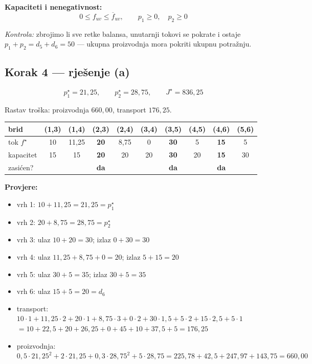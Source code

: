 \begin{zadatak}
\textbf{Kapaciteti i nenegativnost:}
\[
0 \le f_{uv} \le \overline{f}_{uv}, \qquad p_1 \ge 0, \quad p_2 \ge 0
\]

\emph{Kontrola:} zbrojimo li sve retke balansa, unutarnji tokovi se pokrate i
ostaje $p_1 + p_2 = d_5 + d_6 = 50$ --- ukupna proizvodnja mora pokriti ukupnu
potražnju. \checkmark

\subsection*{Korak 4 --- rješenje (a)}

\[
\boxed{\; p_1^\star = 21{,}25, \qquad p_2^\star = 28{,}75, \qquad
J^\star = 836{,}25 \;}
\]

Rastav troška: proizvodnja $660{,}00$, transport $176{,}25$.

\begin{center}
\begin{tabular}{lccccccccc}
\toprule
\textbf{brid} & (1,3) & (1,4) & (2,3) & (2,4) & (3,4) & (3,5) & (4,5) & (4,6) & (5,6) \\
\midrule
tok $f^\star$ & 10 & 11{,}25 & \textbf{20} & 8{,}75 & 0 & \textbf{30} & 5
  & \textbf{15} & 5 \\
kapacitet & 15 & 15 & \textbf{20} & 20 & 20 & \textbf{30} & 20 & \textbf{15} & 30 \\
zasićen? & & & \textbf{da} & & & \textbf{da} & & \textbf{da} & \\
\bottomrule
\end{tabular}
\end{center}

\textbf{Provjere:}
\begin{itemize}
  \item vrh 1: $10 + 11{,}25 = 21{,}25 = p_1^\star$ \checkmark
  \item vrh 2: $20 + 8{,}75 = 28{,}75 = p_2^\star$ \checkmark
  \item vrh 3: ulaz $10+20 = 30$; izlaz $0 + 30 = 30$ \checkmark
  \item vrh 4: ulaz $11{,}25 + 8{,}75 + 0 = 20$; izlaz $5 + 15 = 20$ \checkmark
  \item vrh 5: ulaz $30 + 5 = 35$; izlaz $30 + 5 = 35$ \checkmark
  \item vrh 6: ulaz $15 + 5 = 20 = d_6$ \checkmark
  \item transport: $10\cdot1 + 11{,}25\cdot2 + 20\cdot1 + 8{,}75\cdot3
        + 0\cdot2 + 30\cdot1{,}5 + 5\cdot2 + 15\cdot2{,}5 + 5\cdot1$
        $= 10 + 22{,}5 + 20 + 26{,}25 + 0 + 45 + 10 + 37{,}5 + 5 = 176{,}25$
        \checkmark
  \item proizvodnja: $0{,}5\cdot21{,}25^2 + 2\cdot21{,}25
        + 0{,}3\cdot28{,}75^2 + 5\cdot28{,}75
        = 225{,}78 + 42{,}5 + 247{,}97 + 143{,}75 = 660{,}00$ \checkmark
\end{itemize}


\end{zadatak}
